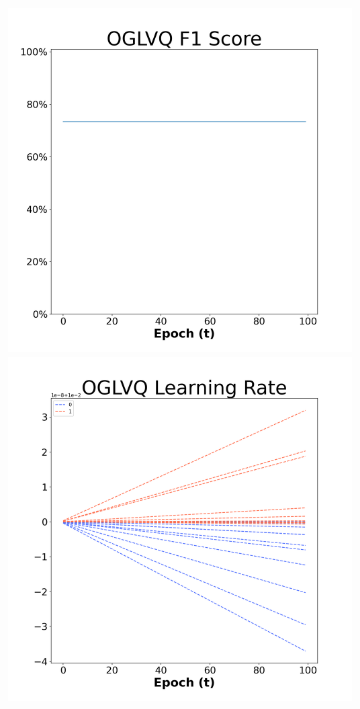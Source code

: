 \begin{figure}[H]
    \centering %
\begin{subfigure}{0.3\textwidth}
  \includegraphics[width=\linewidth]{images/exper2/SP/OGLVQ_0.01_f1.png}
    \includegraphics[width=\linewidth]{images/exper2/SP/OGLVQ_0.01_lr.png}

\end{subfigure}
\end{figure}
